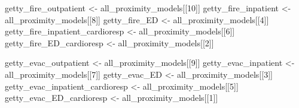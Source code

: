 \documentclass[
]{article}
\newenvironment{Shaded}{\begin{snugshade}}{\end{snugshade}}
\newcommand{\DecValTok}[1]{\textcolor[rgb]{0.00,0.00,0.81}{#1}}
\newcommand{\NormalTok}[1]{#1}
\newcommand{\OtherTok}[1]{\textcolor[rgb]{0.56,0.35,0.01}{#1}}
\begin{document}
\begin{Shaded}
\begin{Highlighting}[]
\NormalTok{getty\_fire\_outpatient }\OtherTok{\textless{}{-}}\NormalTok{ all\_proximity\_models[[}\DecValTok{10}\NormalTok{]]}
\NormalTok{getty\_fire\_inpatient }\OtherTok{\textless{}{-}}\NormalTok{ all\_proximity\_models[[}\DecValTok{8}\NormalTok{]]}
\NormalTok{getty\_fire\_ED }\OtherTok{\textless{}{-}}\NormalTok{ all\_proximity\_models[[}\DecValTok{4}\NormalTok{]]}
\NormalTok{getty\_fire\_inpatient\_cardioresp }\OtherTok{\textless{}{-}}\NormalTok{ all\_proximity\_models[[}\DecValTok{6}\NormalTok{]]}
\NormalTok{getty\_fire\_ED\_cardioresp }\OtherTok{\textless{}{-}}\NormalTok{ all\_proximity\_models[[}\DecValTok{2}\NormalTok{]]}

\NormalTok{getty\_evac\_outpatient }\OtherTok{\textless{}{-}}\NormalTok{ all\_proximity\_models[[}\DecValTok{9}\NormalTok{]]}
\NormalTok{getty\_evac\_inpatient }\OtherTok{\textless{}{-}}\NormalTok{ all\_proximity\_models[[}\DecValTok{7}\NormalTok{]]}
\NormalTok{getty\_evac\_ED }\OtherTok{\textless{}{-}}\NormalTok{ all\_proximity\_models[[}\DecValTok{3}\NormalTok{]]}
\NormalTok{getty\_evac\_inpatient\_cardioresp }\OtherTok{\textless{}{-}}\NormalTok{ all\_proximity\_models[[}\DecValTok{5}\NormalTok{]]}
\NormalTok{getty\_evac\_ED\_cardioresp }\OtherTok{\textless{}{-}}\NormalTok{ all\_proximity\_models[[}\DecValTok{1}\NormalTok{]]}
\end{Highlighting}
\end{Shaded}
\end{document}
